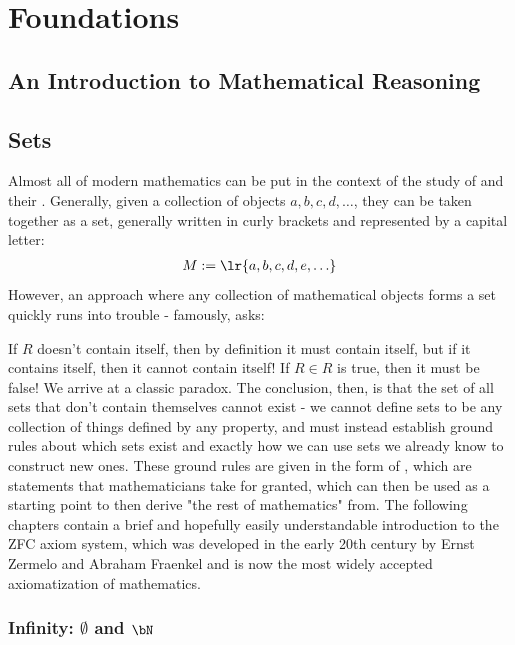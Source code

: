 \part{Foundations}

\chapter{An Introduction to Mathematical Reasoning}
\chapter{Sets}

Almost all of modern mathematics can be put in the context of the study of  and their . Generally, given a collection of objects $a,b,c,d,\hdots$, they can be taken together as a set, generally written in curly brackets and represented by a capital letter:
\begin{align*}
	M := \lr{a,b,c,d,e,\hdots}
\end{align*}
However, an approach where any collection of mathematical objects forms a set quickly runs into trouble - famously,  asks:
\begin{quote}
\end{quote}
If $R$ doesn't contain itself, then by definition it must contain itself, but if it contains itself, then it cannot contain itself! If $R \in R$ is true, then it must be false! We arrive at a classic paradox. The conclusion, then, is that the set of all sets that don't contain themselves cannot exist - we cannot define sets to be any collection of things defined by any property, and must instead establish ground rules about which sets exist and exactly how we can use sets we already know to construct new ones.
\newpar
These ground rules are given in the form of , which are statements that mathematicians take for granted, which can then be used as a starting point to then derive "the rest of mathematics" from. The following chapters contain a brief and hopefully easily understandable introduction to the ZFC axiom system, which was developed in the early 20th century by Ernst Zermelo and Abraham Fraenkel and is now the most widely accepted axiomatization of mathematics.
\section{Infinity: $\emptyset$ and $\bN$}

